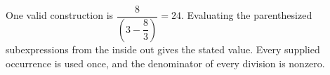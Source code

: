 One valid construction is $\boxed{\dfrac{8}{(3-\dfrac{8}{3})}=24}$. Evaluating the parenthesized subexpressions from the inside out gives the stated value. Every supplied occurrence is used once, and the denominator of every division is nonzero.

